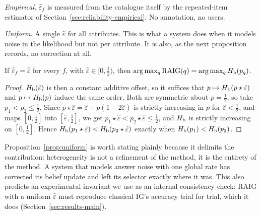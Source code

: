 \emph{Empirical.} $\hat\varepsilon_f$ is measured from the catalogue itself by
the repeated-item estimator of Section~\ref{sec:reliability-empirical}. No
annotation, no users.

\emph{Uniform.} A single $\hat\varepsilon$ for all attributes. This is what a
system does when it models noise in the likelihood but not per attribute. It is
also, as the next proposition records, no correction at all.

\begin{proposition}
\label{prop:uniform}
If $\hat\varepsilon_f = \hat\varepsilon$ for every $f$, with
$\hat\varepsilon \in [0,\tfrac12)$, then
$\arg\max_q \mathrm{RAIG}(q) = \arg\max_q H_{\mathrm{b}}(p_q)$.
\end{proposition}

\begin{proof}
$H_{\mathrm{b}}(\hat\varepsilon)$ is then a constant additive offset, so it suffices that
$p \mapsto H_{\mathrm{b}}(p \star \hat\varepsilon)$ and $p \mapsto H_{\mathrm{b}}(p)$ induce the same
order. Both are symmetric about $p=\tfrac12$, so take $p_1 < p_2 \le \tfrac12$.
Since $p \star \hat\varepsilon = \hat\varepsilon + p(1-2\hat\varepsilon)$ is
strictly increasing in $p$ for $\hat\varepsilon < \tfrac12$, and maps
$[0,\tfrac12]$ into $[\hat\varepsilon,\tfrac12]$, we get
$p_1 \star \hat\varepsilon < p_2 \star \hat\varepsilon \le \tfrac12$, and $H_{\mathrm{b}}$
is strictly increasing on $[0,\tfrac12]$. Hence
$H_{\mathrm{b}}(p_1 \star \hat\varepsilon) < H_{\mathrm{b}}(p_2 \star \hat\varepsilon)$ exactly when
$H_{\mathrm{b}}(p_1) < H_{\mathrm{b}}(p_2)$.
\end{proof}

Proposition~\ref{prop:uniform} is worth stating plainly because it delimits the
contribution: heterogeneity is not a refinement of the method, it is the
entirety of the method. A system that models answer noise with one global rate
has corrected its belief update and left its selector exactly where it was.
This also predicts an experimental invariant we use as an internal
consistency check: RAIG with a uniform $\hat\varepsilon$ must reproduce
classical IG's accuracy trial for trial, which it does
(Section~\ref{sec:results-main}).

